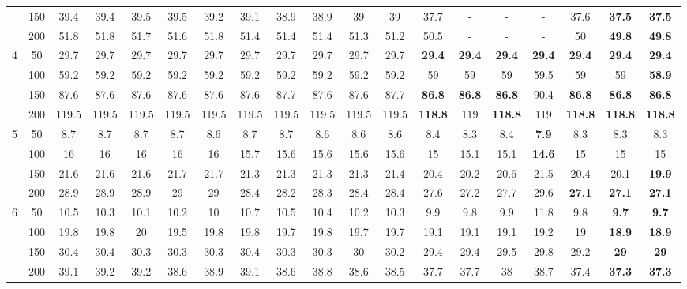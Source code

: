 \begin{table}[htbp]
\begin{adjustbox}{angle=90}
{\begin{tabular}{|c|c|c|c|c|c|c|c|c|c|c|c|c|c|c|c|c|c|c|}
     & 150 & 39.4 & 39.4 & 39.5 & 39.5 & 39.2 & 39.1 & 38.9 & 38.9 & 39 & 39 & 37.7 & - & - & - & 37.6 & \textbf{37.5} & \textbf{37.5} \\ 
     & 200 & 51.8 & 51.8 & 51.7 & 51.6 & 51.8 & 51.4 & 51.4 & 51.4 & 51.3 & 51.2 & 50.5 & - & - & - & 50 & \textbf{49.8} & \textbf{49.8} \\ \hline
    4 & 50 & 29.7 & 29.7 & 29.7 & 29.7 & 29.7 & 29.7 & 29.7 & 29.7 & 29.7 & 29.7 & \textbf{29.4} & \textbf{29.4} & \textbf{29.4} & \textbf{29.4} & \textbf{29.4} & \textbf{29.4} & \textbf{29.4} \\ 
     & 100 & 59.2 & 59.2 & 59.2 & 59.2 & 59.2 & 59.2 & 59.2 & 59.2 & 59.2 & 59.2 & 59 & 59 & 59 & 59.5 & 59 & 59 & \textbf{58.9} \\ 
     & 150 & 87.6 & 87.6 & 87.6 & 87.6 & 87.6 & 87.6 & 87.7 & 87.6 & 87.6 & 87.7 & \textbf{86.8} & \textbf{86.8} & \textbf{86.8} & 90.4 & \textbf{86.8} & \textbf{86.8} & \textbf{86.8} \\ 
     & 200 & 119.5 & 119.5 & 119.5 & 119.5 & 119.5 & 119.5 & 119.5 & 119.5 & 119.5 & 119.5 & \textbf{118.8} & 119 & \textbf{118.8} & 119 & \textbf{118.8} & \textbf{118.8} & \textbf{118.8} \\ \hline
    5 & 50 & 8.7 & 8.7 & 8.7 & 8.7 & 8.6 & 8.7 & 8.7 & 8.6 & 8.6 & 8.6 & 8.4 & 8.3 & 8.4 & \textbf{7.9} & 8.3 & 8.3 & 8.3 \\ 
     & 100 & 16 & 16 & 16 & 16 & 16 & 15.7 & 15.6 & 15.6 & 15.6 & 15.6 & 15 & 15.1 & 15.1 & \textbf{14.6} & 15 & 15 & 15 \\ 
     & 150 & 21.6 & 21.6 & 21.6 & 21.7 & 21.7 & 21.3 & 21.3 & 21.3 & 21.3 & 21.4 & 20.4 & 20.2 & 20.6 & 21.5 & 20.4 & 20.1 & \textbf{19.9} \\ 
     & 200 & 28.9 & 28.9 & 28.9 & 29 & 29 & 28.4 & 28.2 & 28.3 & 28.4 & 28.4 & 27.6 & 27.2 & 27.7 & 29.6 & \textbf{27.1} & \textbf{27.1} & \textbf{27.1} \\ \hline
    6 & 50 & 10.5 & 10.3 & 10.1 & 10.2 & 10 & 10.7 & 10.5 & 10.4 & 10.2 & 10.3 & 9.9 & 9.8 & 9.9 & 11.8 & 9.8 & \textbf{9.7} & \textbf{9.7} \\ 
     & 100 & 19.8 & 19.8 & 20 & 19.5 & 19.8 & 19.8 & 19.7 & 19.8 & 19.7 & 19.7 & 19.1 & 19.1 & 19.1 & 19.2 & 19 & \textbf{18.9} & \textbf{18.9} \\ 
     & 150 & 30.4 & 30.4 & 30.3 & 30.3 & 30.3 & 30.4 & 30.3 & 30.3 & 30 & 30.2 & 29.4 & 29.4 & 29.5 & 29.8 & 29.2 & \textbf{29} & \textbf{29} \\ 
     & 200 & 39.1 & 39.2 & 39.2 & 38.6 & 38.9 & 39.1 & 38.6 & 38.8 & 38.6 & 38.5 & 37.7 & 37.7 & 38 & 38.7 & 37.4 & \textbf{37.3} & \textbf{37.3} \\ \hline

\end{tabular}}
\end{adjustbox}
\end{table}
